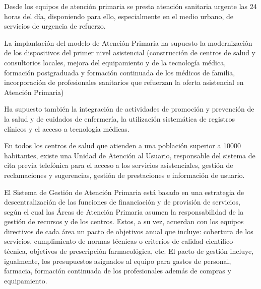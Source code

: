 Desde los equipos de atención primaria se presta atención sanitaria urgente las 24 horas del día, disponiendo para ello, especialmente en el medio urbano, de servicios de urgencia de refuerzo.

La implantación del modelo de Atención Primaria ha supuesto la modernización de los dispositivos del primer nivel asistencial (construcción de centros de salud y consultorios locales, mejora del equipamiento y de la tecnología médica, formación postgraduada y formación continuada de los médicos de familia, incorporación de profesionales sanitarios que refuerzan la oferta asistencial en Atención Primaria)

Ha supuesto también la integración de actividades de promoción y prevención de la salud y de cuidados de enfermería, la utilización sistemática de registros clínicos y el acceso a tecnología médicas.

En todos los centros de salud que atienden a una población superior a 10000 habitantes, existe una Unidad de Atención al Usuario, responsable del sistema de cita previa telefónica para el acceso a los servicios asistenciales, gestión de reclamaciones y sugerencias, gestión de prestaciones e información de usuario.

El Sistema de Gestión de Atención Primaria está basado en una estrategia de descentralización de las funciones de financiación y de provisión de servicios, según el cual las Áreas de Atención Primaria asumen la responsabilidad de la gestión de recursos y de los centros. Estos, a su vez, acuerdan con los equipos directivos de cada área un pacto de objetivos anual que incluye: cobertura de los servicios, cumplimiento de normas técnicas o criterios de calidad científico-técnica, objetivos de prescripción farmacológica, etc. El pacto de gestión incluye, igualmente, los presupuestos asignados al equipo para gastos de personal, farmacia, formación continuada de los profesionales además de compras y equipamiento.